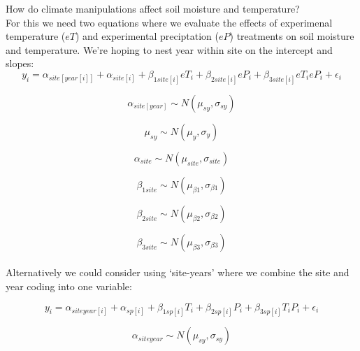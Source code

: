 \documentclass[12pt,a4paper]{article}
\begin{document}
 

 How do climate manipulations affect soil moisture and temperature?\\

\noindent For this we need two equations where we evaluate the effects of experimenal temperature ($eT$) and experimental preciptation ($eP$) treatments on soil moisture and temperature. We're hoping to nest year within site on the intercept and slopes:
\begin{equation}
y_{i}=\alpha_{site[year[i]]}+ \alpha_{site[i]}+\beta_{1 site[i]}eT_i+\beta_{2 site[i]}eP_i+\beta_{3 site[i]}eT_ieP_i+\epsilon_{i}
\end{equation}

\begin{equation}
\alpha_{site[year]} \sim N(\mu_{sy}, \sigma_{sy})
\end{equation}

\begin{equation}
\mu_{sy} \sim N(\mu_{y}, \sigma_{y})
\end{equation}

\begin{equation}
\alpha_{site} \sim N(\mu_{site}, \sigma_{site})
\end{equation}

\begin{equation}
\beta_{1 site} \sim N(\mu_{\beta1}, \sigma_{\beta1})
\end{equation}

\begin{equation}
\beta_{2 site} \sim N(\mu_{\beta2}, \sigma_{\beta2})
\end{equation}

\begin{equation}
\beta_{3 site} \sim N(\mu_{\beta3}, \sigma_{\beta3})
\end{equation}
\vspace{2ex}\\

\noindent Alternatively we could consider using `site-years' where we combine the site and year coding into one variable:

\begin{equation}
y_{i}=\alpha_{siteyear[i]}+ \alpha_{sp[i]}+\beta_{1 sp[i]}T_i+\beta_{2 sp[i]}P_i+\beta_{3 sp[i]}T_iP_i+\epsilon_{i}
\end{equation}

\begin{equation}
\alpha_{siteyear} \sim N(\mu_{sy}, \sigma_{sy})
\end{equation}
\vspace{2ex}\\
\end{document}
